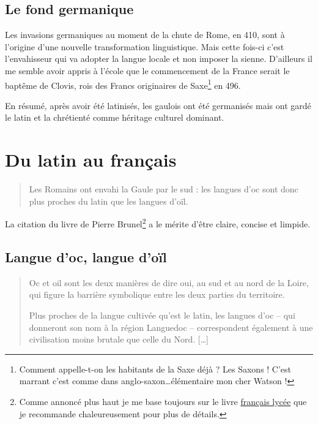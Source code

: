 \documentclass[12pt,a4paper]{book}
\begin{document}
\subsection{Le fond germanique}\label{subsec:germ}
Les invasions germaniques au moment de la chute de Rome, en 410, sont
à l'origine d'une nouvelle transformation linguistique. Mais cette
fois-ci c'est l'envahisseur qui va adopter la langue locale et non
imposer la sienne. D'ailleurs il me semble avoir appris à l'école que
le commencement de la France serait le baptême de Clovis, rois des
Francs originaires de Saxe\footnote{Comment appelle-t-on les habitants
de la Saxe déjà ? Les Saxons ! C'est marrant c'est comme dans
anglo-saxon\dots élémentaire mon cher Watson !} en 496.\par
En résumé, après avoir été latinisés, les gaulois ont été germanisés
mais ont gardé le latin et la chrétienté comme héritage culturel
dominant.

\section{Du latin au français}\label{sec:lat2fr}

\begin{quote}
  Les Romains ont envahi la Gaule par le sud : les langues d'oc sont
  donc plus proches du latin que les langues d'oïl.
\end{quote}

La citation du livre de Pierre Brunel\footnote{Comme annoncé plus haut
je me base toujours sur le livre \href{https://www.amazon.fr/gp/product/2844100015/ref=as\_li\_tl?ie=UTF8\&camp=1642\&creative=6746\&creativeASIN=2844100015\&linkCode=as2\&tag=wwwbecomefree-21\&linkId=985f3a849fd44728e8480993cf2d5490}{français
  lycée} que je recommande chaleureusement pour plus de détails.} a le
mérite d'être claire, concise et limpide.
\subsection{Langue d'oc, langue d'oïl}

\begin{quote}
  Oc et oil sont les deux manières de dire oui, au sud et au nord de
  la Loire, qui figure la barrière symbolique entre les deux parties
  du territoire.\par
  Plus proches de la langue cultivée qu'est le latin, les langues d'oc
  -- qui donneront son nom à la région Languedoc -- correspondent
  également à une civilisation moins brutale que celle du Nord. [\dots]
\end{quote}
\end{document}
